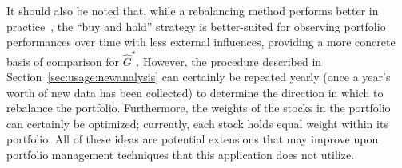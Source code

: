 It should also be noted that, while a rebalancing method performs better in 
practice~\cite{liuh2016}, the ``buy and hold'' strategy is better-suited for 
observing portfolio performances over time with less external influences, 
providing a more concrete basis of comparison for $\hat{G}^*$. 
However, the procedure described in Section~\ref{sec:usage:newanalysis}
can certainly be repeated yearly (once a year's worth of new data has been 
collected) to determine the direction in which to 
rebalance the portfolio. Furthermore, the weights of the stocks in the 
portfolio can certainly be optimized; currently, each stock holds equal 
weight within its portfolio. All of these ideas are 
potential extensions that may improve upon portfolio management techniques that 
this application does not utilize.


